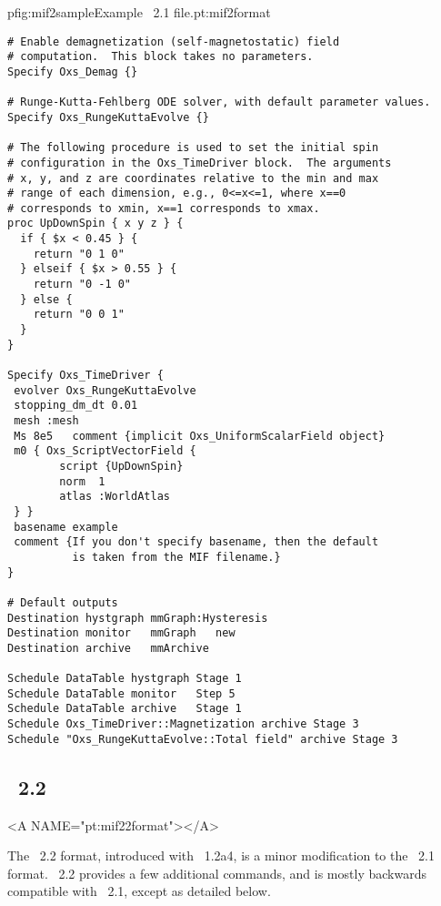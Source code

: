 \begin{codelisting}{p}{fig:mif2sample}{Example \MIF~2.1 file.}{pt:mif2format}
\begin{verbatim}
# Enable demagnetization (self-magnetostatic) field
# computation.  This block takes no parameters.
Specify Oxs_Demag {}

# Runge-Kutta-Fehlberg ODE solver, with default parameter values.
Specify Oxs_RungeKuttaEvolve {}

# The following procedure is used to set the initial spin
# configuration in the Oxs_TimeDriver block.  The arguments
# x, y, and z are coordinates relative to the min and max
# range of each dimension, e.g., 0<=x<=1, where x==0
# corresponds to xmin, x==1 corresponds to xmax.
proc UpDownSpin { x y z } {
  if { $x < 0.45 } {
    return "0 1 0"
  } elseif { $x > 0.55 } {
    return "0 -1 0"
  } else {
    return "0 0 1"
  }
}

Specify Oxs_TimeDriver {
 evolver Oxs_RungeKuttaEvolve
 stopping_dm_dt 0.01
 mesh :mesh
 Ms 8e5   comment {implicit Oxs_UniformScalarField object}
 m0 { Oxs_ScriptVectorField {
        script {UpDownSpin}
        norm  1
        atlas :WorldAtlas
 } }
 basename example
 comment {If you don't specify basename, then the default
          is taken from the MIF filename.}
}

# Default outputs
Destination hystgraph mmGraph:Hysteresis
Destination monitor   mmGraph   new
Destination archive   mmArchive

Schedule DataTable hystgraph Stage 1
Schedule DataTable monitor   Step 5
Schedule DataTable archive   Stage 1
Schedule Oxs_TimeDriver::Magnetization archive Stage 3
Schedule "Oxs_RungeKuttaEvolve::Total field" archive Stage 3
\end{verbatim}
\end{codelisting}


\subsection{\MIF\ 2.2}\label{sec:mif22format}
\begin{rawhtml}
<A NAME="pt:mif22format"></A>
\end{rawhtml}
The \MIF~2.2 format, introduced with \OOMMF~1.2a4, is a minor
modification to the \MIF~2.1 format.  \MIF~2.2 provides a few additional
commands, and is mostly backwards compatible with \MIF~2.1, except as
detailed below.
